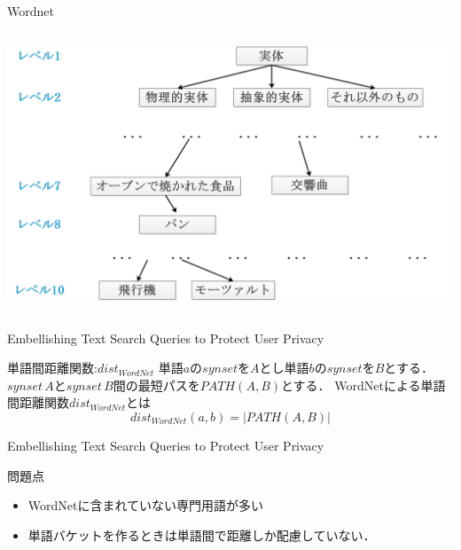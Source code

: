 \documentclass[14pt,xcolor=dvipsnames,table,dvipdfmx]{beamer}
\begin{document}
\begin{frame}{Wordnet}
	\begin{columns}[t]
		\begin{column}{1.0\textwidth} %
			\includegraphics[width=\columnwidth]{rk15.png}
		\end{column}
	\end{columns}
\end{frame}

\begin{frame}{Embellishing Text Search Queries to Protect User Privacy \cite{embellishing2010}}
	\begin{block}{単語間距離関数:$dist_{WordNet}$}
		単語$a$の$synset$を$A$とし単語$b$の$synset$を$B$とする．
		$synset \, A$と$synset \, B$間の最短パスを$PATH(A,B)$とする．
		WordNetによる単語間距離関数$dist_{WordNet}$とは
		\begin{equation}
			dist_{WordNet}(a,b) = |PATH(A,B)|
		\end{equation}
	\end{block}
\end{frame}

\begin{frame}{Embellishing Text Search Queries to Protect User Privacy \cite{embellishing2010}}
	\begin{block}{問題点}
		\begin{itemize}
			\item 	WordNetに含まれていない専門用語が多い
			\item 	単語バケットを作るときは単語間で距離しか配慮していない．
		\end{itemize}
	\end{block}
\end{frame}
\end{document}
